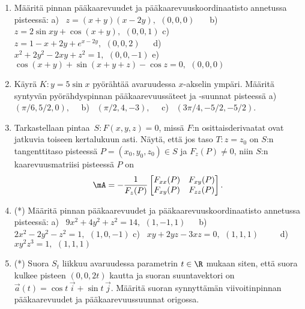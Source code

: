 \Harj
\begin{enumerate}

\item 
Määritä pinnan pääkaarevuudet ja pääkaarevuuskoordinaatisto annetussa pisteessä:
\vspace{1mm}\newline
a) \ $z=(x+y)(x-2y),\,\ (0,0,0) \quad\ \ $
b) \ $z=2\sin xy + \cos(x+y),\,\ (0,0,1)$ \newline
c) \ $z=1-x+2y+e^{x-2y},\,\ (0,0,2) \quad\ $
d) \ $x^2+2y^2-2xy+z^2=1,\,\ (0,0,-1)$ \newline
e) \ $\cos(x+y)+\sin(x+y+z)-\cos z=0,\,\ (0,0,0)$

\item
Käyrä $K: y=5\sin x$ pyörähtää avaruudessa $x$-akselin ympäri. Määritä syntyvän pyörähdyspinnan 
pääkaarevuussäteet ja -suunnat pisteessä \vspace{1mm}\newline
a) \ $(\pi/6,5/2,0), \quad$
b) \ $(\pi/2,4,-3), \quad$ 
c) \ $(3\pi/4,-5/2,-5/2)$.

\item \label{H-eig-3: kaarevuusmatriisi}
Tarkastellaan pintaa $\,S: F(x,y,z)=0$, missä $F$:n osittaisderivaatat ovat jatkuvia toiseen
kertalukuun asti. Näytä, että jos taso $T: z=z_0$ on $S$:n tangenttitaso pisteessä
$P=(x_0,y_0,z_0) \in S$ ja $F_z(P) \neq 0$, niin $S$:n kaarevuusmatriisi pisteessä $P$ on
\[
\mA=-\frac{1}{F_z(P)} \begin{bmatrix} F_{xx}(P)&F_{xy}(P)\\F_{xy}(P)&F_{zz}(P) \end{bmatrix}.
\]

\item (*)
Määritä pinnan pääkaarevuudet ja pääkaarevuuskoordinaatisto annetussa pisteessä:
\vspace{1mm}\newline
a) \ $9x^2+4y^2+z^2=14,\,\ (1,-1,1) \quad\ $
b) \ $2x^2-2y^2-z^2=1,\,\ (1,0,-1)$ \newline
c) \ $xy+2yz-3xz=0,\,\ (1,1,1) \qquad\ $
d) \ $xy^2z^3=1,\,\ (1,1,1)$

\item (*)
Suora $S_t$ liikkuu avaruudessa parametrin $t\in\R$ mukaan siten, että suora kulkee pisteen
$(0,0,2t)$ kautta ja suoran suuntavektori on $\vec a(t)=\cos t\,\vec i+\sin t\,\vec j$. Määritä
suoran synnyttämän viivoitinpinnan pääkaarevuudet ja pääkaarevuussuunnat origossa.

\end{enumerate}